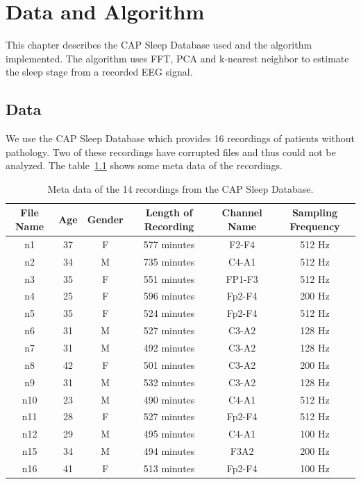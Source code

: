 \chapter{Data and Algorithm}
\label{chapter:data_and_algorithm}

This chapter describes the CAP Sleep Database used and the algorithm implemented. The algorithm uses FFT, PCA and k-nearest neighbor to estimate the sleep stage from a recorded EEG signal.

\section{Data}
\label{sec:data}

We use the CAP Sleep Database\cite{Terzano2001}\cite{Goldberger2000} which provides 16 recordings of patients without pathology. Two of these recordings have corrupted files and thus could not be analyzed. The table~\ref{tab:meta_data_of_recordings} shows some meta data of the recordings.

\begin{table}
	\centering
	\begin{tabular}{c|c|c|c|c|c}
		File Name & Age & Gender & Length of Recording & Channel Name & Sampling Frequency \\
		\hline
		n1  & 37 & F & 577 minutes & F2-F4  & 512 Hz \\
		n2  & 34 & M & 735 minutes & C4-A1  & 512 Hz \\
		n3  & 35 & F & 551 minutes & FP1-F3 & 512 Hz \\
		n4  & 25 & F & 596 minutes & Fp2-F4 & 200 Hz \\
		n5  & 35 & F & 524 minutes & Fp2-F4 & 512 Hz \\
		n6  & 31 & M & 527 minutes & C3-A2  & 128 Hz \\
		n7  & 31 & M & 492 minutes & C3-A2  & 128 Hz \\
		n8  & 42 & F & 501 minutes & C3-A2  & 200 Hz \\
		n9  & 31 & M & 532 minutes & C3-A2  & 128 Hz \\
		n10 & 23 & M & 490 minutes & C4-A1  & 512 Hz \\
		n11 & 28 & F & 527 minutes & Fp2-F4 & 512 Hz \\
		n12 & 29 & M & 495 minutes & C4-A1  & 100 Hz \\
		n15 & 34 & M & 494 minutes & F3A2   & 200 Hz \\
		n16 & 41 & F & 513 minutes & Fp2-F4 & 100 Hz \\
	\end{tabular}
	\caption{Meta data of the 14 recordings from the CAP Sleep Database.}
	\label{tab:meta_data_of_recordings}
\end{table}

